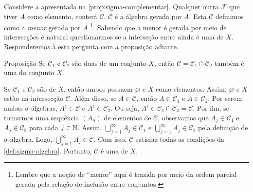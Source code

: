 Considere a \sigal apresentada na \ref{prop:sigma-complementar}. 
Qualquer outra \sigal $\mathcal{F}$ que tiver $A$ como elemento, conterá $\mathcal{C}$.
$\mathcal{C}$ é a álgebra gerada por $A$.
Esta \sigal $\mathcal{C}$   definimos como a \textit{menor} \sigal gerada por $A$ 
%
\footnote{Lembre que a noção de \enquote{menor} aqui é trazida por meio da ordem parcial gerada pela relação de inclusão entre conjuntos.}.
%
Sabendo que a menor \sigal é gerada por meio de intersecções é natural questionarmos se a interseção entre \sigals ainda é uma \sigal de $X$.
Responderemos à esta pergunta com a proposição adiante.
\vspace{-0.1cm}
\begin{env}{Proposição}
\label{prop:interseção-2sigmas}
    Se $\mathcal{C}_1$ e $\mathcal{C}_2$ são duas \sigals de um conjunto $X$, então $\mathcal{C} = \mathcal{C}_1 \cap \mathcal{C}_2$ também é uma \sigal do conjunto $X$.
\end{env}
\begin{prova}
    Se $\mathcal{C}_1$ e $\mathcal{C}_2$ são \sigals de $X$, então ambos possuem $\varnothing$ e $X$ como elementos.
    Assim, $\varnothing$ e $X$ estão na intersecção $\mathcal{C}$.
    Além disso, se $A \in \mathcal{C}$, então $A \in \mathcal{C}_1$ e $A \in \mathcal{C}_2$. 
    Por serem ambas $\sigma$-álgebras, $A^c \in \mathcal{C}$ e $A^c \in \mathcal{C}_2$.
    Ou seja, $A^c \in \mathcal{C}_1 \cap \mathcal{C}_2 = \mathcal{C}$.
    Por fim, se tomarmos uma sequência $(A_n)$ de elementos de $\mathcal{C}$, observamos que $A_j \in \mathcal{C}_1$ e $A_j \in \mathcal{C}_2$ para cada $j \in \operatorname{\mathbb{N}}$.
    Assim, $\displaystyle \bigcup_{j = 1}^\infty A_j \in \mathcal{C}_1$ e 
    $\displaystyle \bigcup_{j = 1}^\infty A_j \in \mathcal{C}_2$ pela definição de $\sigma$-álgebra.
    Logo, $\displaystyle \bigcup_{j = 1}^\infty A_j \in \mathcal{C}$.
    Com isso, $\mathcal{C}$ satisfaz todas as condições da \ref{def:sigma-algebra}. 
    Portanto, $\mathcal{C}$ é uma \sigal de $X$.
\end{prova}

